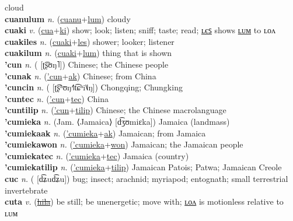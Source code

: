 cloud \label{cuanules} \\
\textbf{cuanulum} \textit{n.} (\hyperref[cuanu]{cuanu}+\hyperref[lum]{lum})
cloudy \label{cuanulum} \\
\textbf{cuaki} \textit{v.} (\hyperref[cua]{cua}+\hyperref[ki]{ki})
show; look; listen; sniff; taste; read; \hyperref[cuakiles]{ʟєꜱ} shows \hyperref[cuakilum]{ʟᴜᴍ} to ʟᴏᴧ \label{cuaki} \\
\textbf{cuakiles} \textit{n.} (\hyperref[cuaki]{cuaki}+\hyperref[les]{les})
shower; looker; listener \label{cuakiles} \\
\textbf{cuakilum} \textit{n.} (\hyperref[cuaki]{cuaki}+\hyperref[lum]{lum})
thing that is shown \label{cuakilum} \\
\textbf{'cun} \textit{n.} ( [ʈ͡ʂʊŋ˥])
Chinese; the Chinese people \label{'cun} \\
\textbf{'cunak} \textit{n.} (\hyperref['cun]{'cun}+\hyperref[ak]{ak})
Chinese; from China \label{'cunak} \\
\textbf{'cuncin} \textit{n.} ( [ʈ͡ʂʰʊŋ˧˥t͡ɕʰi˥˩ŋ])
Chongqing; Chungking \label{'cuncin} \\
\textbf{'cuntec} \textit{n.} (\hyperref['cun]{'cun}+\hyperref[tec]{tec})
China \label{'cuntec} \\
\textbf{'cuntilip} \textit{n.} (\hyperref['cun]{'cun}+\hyperref[tilip]{tilip})
Chinese; the Chinese macrolanguage \label{'cuntilip} \\
\textbf{'cumieka} \textit{n.} (Jam. ⟨Jamaica⟩ [d͡ʒʊmiɛka])
Jamaica (landmass) \label{'cumieka} \\
\textbf{'cumiekaak} \textit{n.} (\hyperref['cumieka]{'cumieka}+\hyperref[ak]{ak})
Jamaican; from Jamaica \label{'cumiekaak} \\
\textbf{'cumiekawon} \textit{n.} (\hyperref['cumieka]{'cumieka}+\hyperref[won]{won})
Jamaican; the Jamaican people \label{'cumiekawon} \\
\textbf{'cumiekatec} \textit{n.} (\hyperref['cumieka]{'cumieka}+\hyperref[tec]{tec})
Jamaica (country) \label{'cumiekatec} \\
\textbf{'cumiekatilip} \textit{n.} (\hyperref['cumieka]{'cumieka}+\hyperref[tilip]{tilip})
Jamaican Patois; Patwa; Jamaican Creole \label{'cumiekatilip} \\
\textbf{cuc} \textit{n.} ( [d͡ʑud͡ʑu])
bug; insect; arachnid; myriapod; entognath; small terrestrial invertebrate \label{cuc} \\
\textbf{cuta} \textit{v.} (\hyperref[hila]{\sout{hila}})
be still; be unenergetic; move with; \hyperref[cutalon]{ʟᴏᴧ} is motionless relative to ʟᴜᴍ \label{cuta} \\

